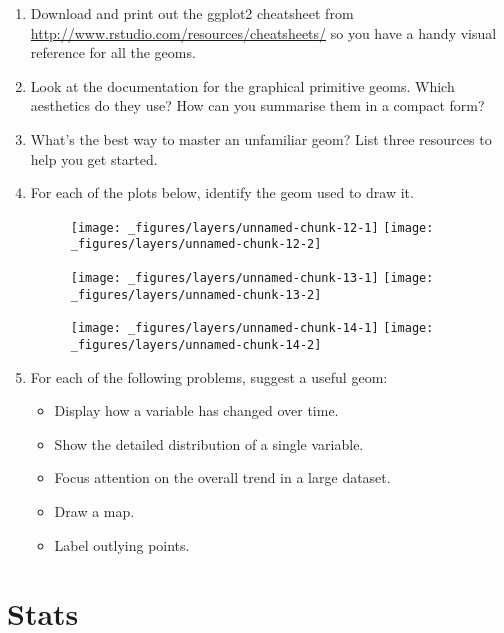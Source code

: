 \begin{enumerate}
\def\labelenumi{\arabic{enumi}.}
\item
  Download and print out the ggplot2 cheatsheet from
  \url{http://www.rstudio.com/resources/cheatsheets/} so you have a
  handy visual reference for all the geoms.
\item
  Look at the documentation for the graphical primitive geoms. Which
  aesthetics do they use? How can you summarise them in a compact form?
\item
  What's the best way to master an unfamiliar geom? List three resources
  to help you get started.
\item
  For each of the plots below, identify the geom used to draw it.

  \begin{figure}[H]
    \texttt{[image: \_figures/layers/unnamed-chunk-12-1]}%
    \texttt{[image: \_figures/layers/unnamed-chunk-12-2]}
  \end{figure}

  \begin{figure}[H]
    \texttt{[image: \_figures/layers/unnamed-chunk-13-1]}%
    \texttt{[image: \_figures/layers/unnamed-chunk-13-2]}
  \end{figure}

  \begin{figure}[H]
    \texttt{[image: \_figures/layers/unnamed-chunk-14-1]}%
    \texttt{[image: \_figures/layers/unnamed-chunk-14-2]}
  \end{figure}
\item
  For each of the following problems, suggest a useful geom:

  \begin{itemize}
  \tightlist
  \item
    Display how a variable has changed over time.
  \item
    Show the detailed distribution of a single variable.
  \item
    Focus attention on the overall trend in a large dataset.
  \item
    Draw a map.
  \item
    Label outlying points.
  \end{itemize}
\end{enumerate}

\hypertarget{sec:stat}{\section{Stats}\label{sec:stat}}

